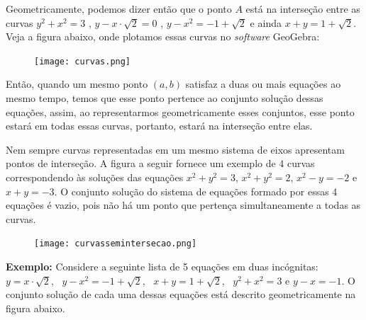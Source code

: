 Geometricamente, podemos dizer então que o ponto $A$ está na interseção entre as curvas $y^2 + x^2 = 3$  , $y - x\cdot \sqrt{2} = 0$ ,  $y - x^2 = -1 + \sqrt{2}$ e ainda $x + y = 1 + \sqrt{2}$. Veja a figura abaixo, onde plotamos essas curvas no \emph{software} GeoGebra: 


\begin{figure}[H]
\centering

\noindent\texttt{[image: curvas.png]}
\end{figure}


Então, quando um mesmo ponto $(a,b)$ satisfaz a duas ou mais equações ao mesmo tempo, temos que esse ponto pertence ao conjunto solução dessas equações, assim, ao representarmos geometricamente esses conjuntos, esse ponto estará em todas essas curvas, portanto, estará na interseção entre elas.

Nem sempre curvas representadas em um mesmo sistema de eixos apresentam pontos de interseção. A figura a seguir fornece um exemplo de 4 curvas correspondendo às soluções das equações $x^2 + y^2 = 3$, $x^2 + y^2 = 2$, $x^2 - y = -2$ e $x+y = -3$. O conjunto solução do sistema de equações formado por essas 4 equações é vazio, pois não há um ponto que pertença simultaneamente a todas as curvas.


\begin{figure}[H]
\centering

\noindent\texttt{[image: curvassemintersecao.png]}
\end{figure}


\textbf{Exemplo:} Considere a seguinte lista de 5 equações em duas incógnitas: $y = x \cdot \sqrt{2}$, \ $y -x^2 = -1 + \sqrt{2}$, \ $ x+y = 1 + \sqrt{2}$, \ $y^2 + x^2 = 3$ e $y-x = -1$. O conjunto solução de cada uma dessas equações está descrito geometricamente na figura abaixo.  

